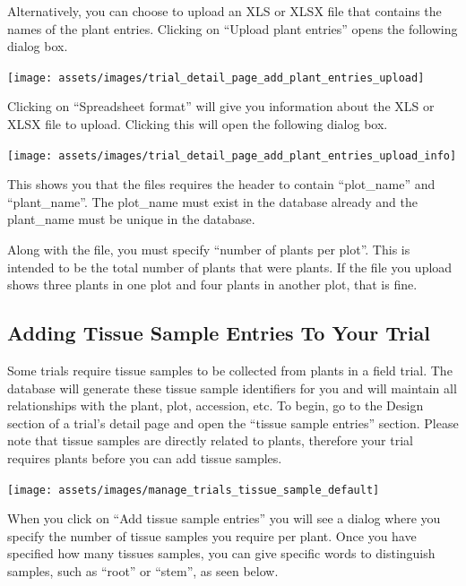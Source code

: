 \documentclass[
  12pt,
]{book}
\begin{document}
Alternatively, you can choose to upload an XLS or XLSX file that contains the names of the plant entries. Clicking on ``Upload plant entries'' opens the following dialog box.

\begin{center}\texttt{[image: assets/images/trial\_detail\_page\_add\_plant\_entries\_upload]} \end{center}

Clicking on ``Spreadsheet format'' will give you information about the XLS or XLSX file to upload. Clicking this will open the following dialog box.

\begin{center}\texttt{[image: assets/images/trial\_detail\_page\_add\_plant\_entries\_upload\_info]} \end{center}

This shows you that the files requires the header to contain ``plot\_name'' and ``plant\_name''. The plot\_name must exist in the database already and the plant\_name must be unique in the database.

Along with the file, you must specify ``number of plants per plot''. This is intended to be the total number of plants that were plants. If the file you upload shows three plants in one plot and four plants in another plot, that is fine.

\hypertarget{adding-tissue-sample-entries-to-your-trial}{%
\subsection{Adding Tissue Sample Entries To Your Trial}\label{adding-tissue-sample-entries-to-your-trial}}

Some trials require tissue samples to be collected from plants in a field trial. The database will generate these tissue sample identifiers for you and will maintain all relationships with the plant, plot, accession, etc. To begin, go to the Design section of a trial's detail page and open the ``tissue sample entries'' section. Please note that tissue samples are directly related to plants, therefore your trial requires plants before you can add tissue samples.

\begin{center}\texttt{[image: assets/images/manage\_trials\_tissue\_sample\_default]} \end{center}

When you click on ``Add tissue sample entries'' you will see a dialog where you specify the number of tissue samples you require per plant. Once you have specified how many tissues samples, you can give specific words to distinguish samples, such as ``root'' or ``stem'', as seen below.
\end{document}
